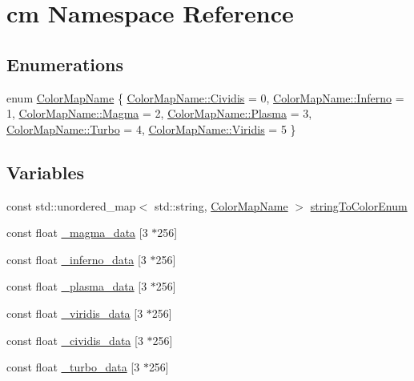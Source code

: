 \hypertarget{namespacecm}{}\section{cm Namespace Reference}
\label{namespacecm}
\subsection*{Enumerations}
\begin{DoxyCompactItemize}
\item 
enum \hyperlink{namespacecm_aabaf84796e8a93bd6adca4c5bdea5311}{Color\+Map\+Name} \{ \newline
\hyperlink{namespacecm_aabaf84796e8a93bd6adca4c5bdea5311a64c2ad47aeb457c258518a5318ed071d}{Color\+Map\+Name\+::\+Cividis} = 0, 
\hyperlink{namespacecm_aabaf84796e8a93bd6adca4c5bdea5311a8bb279f735c1d9c831e935cca2613b58}{Color\+Map\+Name\+::\+Inferno} = 1, 
\hyperlink{namespacecm_aabaf84796e8a93bd6adca4c5bdea5311a1b62e99f86d45e754e5e79d9fa9dfcde}{Color\+Map\+Name\+::\+Magma} = 2, 
\hyperlink{namespacecm_aabaf84796e8a93bd6adca4c5bdea5311ab20a4217acaf4316739c6a5f6679ef60}{Color\+Map\+Name\+::\+Plasma} = 3, 
\newline
\hyperlink{namespacecm_aabaf84796e8a93bd6adca4c5bdea5311a6f53bfe04e78da893ba0c4f35ba6847e}{Color\+Map\+Name\+::\+Turbo} = 4, 
\hyperlink{namespacecm_aabaf84796e8a93bd6adca4c5bdea5311a951ee92ee5e947e1e7e1cb6376523c1a}{Color\+Map\+Name\+::\+Viridis} = 5
 \}
\end{DoxyCompactItemize}
\subsection*{Variables}
\begin{DoxyCompactItemize}
\item 
const std\+::unordered\+\_\+map$<$ std\+::string, \hyperlink{namespacecm_aabaf84796e8a93bd6adca4c5bdea5311}{Color\+Map\+Name} $>$ \hyperlink{namespacecm_a62bba085a1fd823321f70d53df62ed53}{string\+To\+Color\+Enum}
\item 
const float \hyperlink{namespacecm_a6c7ebc740c952f5ae2569bbc4d6b0ba3}{\+\_\+magma\+\_\+data} \mbox{[}3 $\ast$256\mbox{]}
\item 
const float \hyperlink{namespacecm_abd85098a9455ec3b6a1367e717904d81}{\+\_\+inferno\+\_\+data} \mbox{[}3 $\ast$256\mbox{]}
\item 
const float \hyperlink{namespacecm_a5e6bdf45c99146f14941db900036b42c}{\+\_\+plasma\+\_\+data} \mbox{[}3 $\ast$256\mbox{]}
\item 
const float \hyperlink{namespacecm_af931122787ac6cf5d5c8d834adcb3fc8}{\+\_\+viridis\+\_\+data} \mbox{[}3 $\ast$256\mbox{]}
\item 
const float \hyperlink{namespacecm_a9aebd281c6d694ef79eb8f989866ff6d}{\+\_\+cividis\+\_\+data} \mbox{[}3 $\ast$256\mbox{]}
\item 
const float \hyperlink{namespacecm_a1394411b557deb7b6f8c58a9c39ff4a3}{\+\_\+turbo\+\_\+data} \mbox{[}3 $\ast$256\mbox{]}
\end{DoxyCompactItemize}


